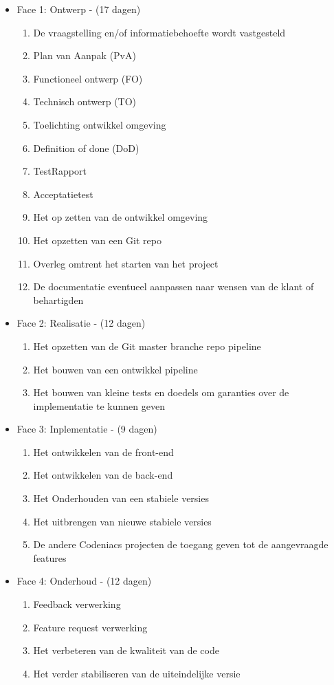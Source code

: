 \documentclass[]{report}
\begin{document}
\begin{itemize}
	\item Face 1: Ontwerp - (17 dagen)
	\begin{enumerate}
		\item De vraagstelling en/of informatiebehoefte wordt vastgesteld
		\item Plan van Aanpak (PvA)
		\item Functioneel ontwerp (FO)
		\item Technisch ontwerp (TO)
		\item Toelichting ontwikkel omgeving
		\item Definition of done (DoD)
		\item TestRapport 
		\item Acceptatietest
		\item Het op zetten van de ontwikkel omgeving
		\item Het opzetten van een Git repo
		\item Overleg omtrent het starten van het project
		\item De documentatie eventueel aanpassen naar wensen van de klant of behartigden
			\newline
	\end{enumerate} 
	
	
	\item Face 2: Realisatie - (12 dagen)
	\begin{enumerate}
		\item Het opzetten van de Git master branche repo pipeline
		\item Het bouwen van een ontwikkel pipeline
		\item Het bouwen van kleine tests en doedels om garanties over de implementatie te kunnen geven
			\newline
	\end{enumerate} 
	
	
	\item Face 3: Inplementatie  - (9 dagen)
	\begin{enumerate}
		\item Het ontwikkelen van de front-end
		\item Het ontwikkelen van de back-end
		\item Het Onderhouden van een stabiele versies
		\item Het uitbrengen van nieuwe stabiele versies
		\item De andere Codeniacs projecten de toegang geven tot de aangevraagde features 
			\newline
	\end{enumerate} 


	\item Face 4: Onderhoud  - (12 dagen)
	\begin{enumerate}
		\item Feedback verwerking
		\item Feature request verwerking
		\item Het verbeteren van de kwaliteit van de code
		\item Het verder stabiliseren van de uiteindelijke versie
	\end{enumerate} 
\end{itemize} 
\end{document}
